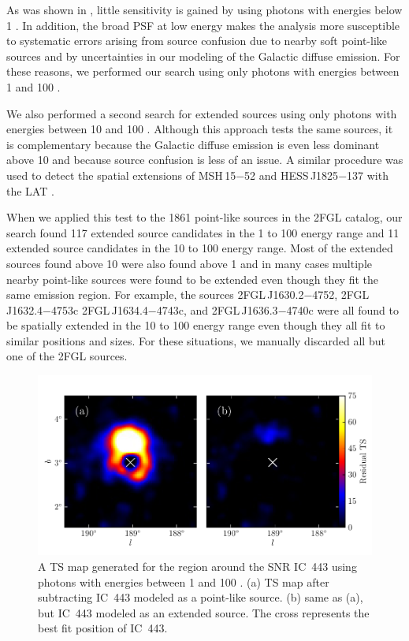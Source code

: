 As was shown in , little sensitivity is
gained by using photons with energies below 1 \gev. In addition, the
broad PSF at low energy makes the analysis more susceptible to systematic
errors arising from source confusion due to nearby soft point-like sources
and by uncertainties in our modeling of the Galactic diffuse emission.
For these reasons, we performed our search using only photons with
energies between 1 \gev and 100 \gev.

We also performed a second search for extended sources using only
photons with energies between 10 \gev and 100 \gev.  Although this
approach tests the same sources, it is complementary because the Galactic
diffuse emission is even less dominant above 10 \gev and because source
confusion is less of an issue.  A similar procedure was used to detect
the spatial extensions of MSH\,15$-$52 and HESS\,J1825$-$137 with the
LAT \citep{abdo_2010a_detection-energetic,grondin_2011a_detection-pulsar}.

When we applied this test to the 1861 point-like sources in the 2FGL
catalog, our search found 117 extended source candidates in the 1 \gev
to 100 \gev energy range and 11 extended source candidates in the 10
\gev to 100 \gev energy range. Most of the extended sources found above
10 \gev were also found above 1 \gev and in many cases multiple nearby
point-like sources were found to be extended even though they fit the
same emission region.  For example, the sources 2FGL\,J1630.2$-$4752,
2FGL\,J1632.4$-$4753c 2FGL\,J1634.4$-$4743c, and 2FGL\,J1636.3$-$4740c
were all found to be spatially extended in the 10 \gev to 100 \gev energy
range even though they all fit to similar positions and sizes.  For these
situations, we manually discarded all but one of the 2FGL sources.

\begin{figure}[htbp]
  \includegraphics{chapters/extended_search/figures/ic443_plots/res_tsmap_ic443_color.pdf}
  \caption{A TS map generated for the region around the SNR IC~443 using
  photons with energies between 1 \gev and 100 \gev.  (a) TS map after
  subtracting IC~443 modeled as a point-like source. (b) same as (a),
  but IC~443 modeled as an extended source. The cross represents the
  best fit position of IC~443.}
\end{figure}


